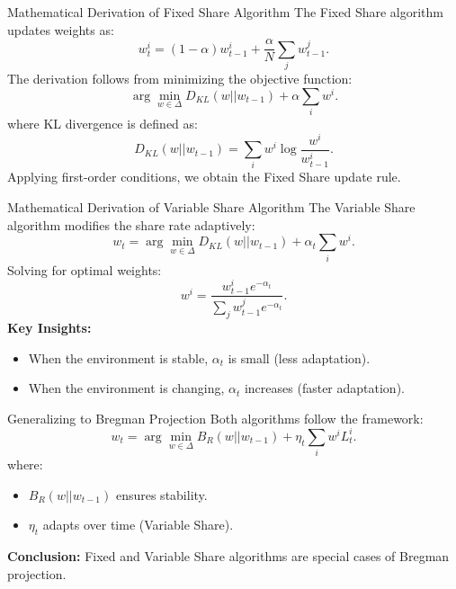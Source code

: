 \documentclass{beamer}
\begin{document}
\begin{frame}{Mathematical Derivation of Fixed Share Algorithm}
    The Fixed Share algorithm updates weights as:
    \begin{equation}
        w_t^i = (1 - \alpha) w_{t-1}^i + \frac{\alpha}{N} \sum_{j} w_{t-1}^j.
    \end{equation}
    The derivation follows from minimizing the objective function:
    \begin{equation}
        \arg\min_{w \in \Delta} D_{KL}(w || w_{t-1}) + \alpha \sum_{i} w^i.
    \end{equation}
    where KL divergence is defined as:
    \begin{equation}
        D_{KL}(w || w_{t-1}) = \sum_{i} w^i \log \frac{w^i}{w_{t-1}^i}.
    \end{equation}
    Applying first-order conditions, we obtain the Fixed Share update rule.
\end{frame}

\begin{frame}{Mathematical Derivation of Variable Share Algorithm}
    The Variable Share algorithm modifies the share rate adaptively:
    \begin{equation}
        w_t = \arg\min_{w \in \Delta} D_{KL}(w || w_{t-1}) + \alpha_t \sum_{i} w^i.
    \end{equation}
    Solving for optimal weights:
    \begin{equation}
        w^i = \frac{w_{t-1}^i e^{-\alpha_t}}{\sum_{j} w_{t-1}^j e^{-\alpha_t}}.
    \end{equation}
    \textbf{Key Insights:}
    \begin{itemize}
        \item When the environment is stable, $\alpha_t$ is small (less adaptation).
        \item When the environment is changing, $\alpha_t$ increases (faster adaptation).
    \end{itemize}
\end{frame}

\begin{frame}{Generalizing to Bregman Projection}
    Both algorithms follow the framework:
    \begin{equation}
        w_t = \arg\min_{w \in \Delta} B_R(w || w_{t-1}) + \eta_t \sum_{i} w^i L_t^i.
    \end{equation}
    where:
    \begin{itemize}
        \item $B_R(w || w_{t-1})$ ensures stability.
        \item $\eta_t$ adapts over time (Variable Share).
    \end{itemize}
    \textbf{Conclusion:} Fixed and Variable Share algorithms are special cases of Bregman projection.
\end{frame}
\end{document}

